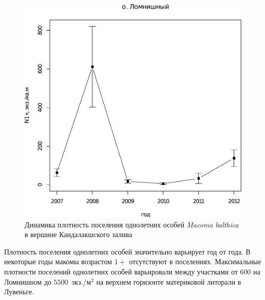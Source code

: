 \begin{figure}[p]
\begin{minipage}[b]{.49\linewidth}
\begin{center}
		\includegraphics[width=\linewidth]{../White_Sea/Lomnishniy/Lomnishniy_N_oneyear1.pdf}
	\end{center}
	\end{minipage}

	\caption{Динамика плотность поселения однолетних особей {\it Macoma balthica} в вершине Кандалакшского залива}
	\label{ris:dynamic_1year_Kandalaksha}
	\end{figure}
Плотность поселения однолетних особей значительно варьирует год от года. 
В некоторые годы макомы возрастом $1+$ отсутствуют в поселениях.
Максимальные плотности поселений однолетних особей варьировали между участками от $600$ на Ломнишном до $5500$~экз./м$^2$ на верхнем горизонте материковой литорали в Лувеньге.

